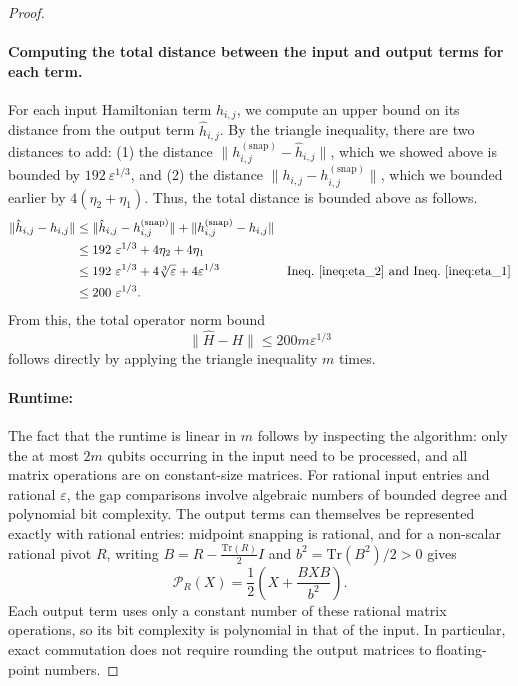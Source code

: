 \documentclass[a4paper,onecolumn,11pt]{quantumarticle}
\theoremstyle{plain}
\newcommand{\eps}{\varepsilon}
\newcommand{\snp}{{(\mathrm{snap})}}
\begin{document}
\begin{proof}
\paragraph{Computing the total distance between the input and output terms for each term.}
For each input Hamiltonian term $h_{i,j}$, we compute an upper bound on its distance from the output term $\hat{h}_{i,j}$. By the triangle inequality, there are two distances to add: (1) the distance $\|h^\snp_{i,j} - \hat{h}_{i,j}\|$, which we showed above is bounded by $192\ \eps^{1/3}$, and (2) the distance $\|h_{i,j} - h^\snp_{i,j} \|$, which we bounded earlier by $4 (\eta_2 + \eta_1)$. Thus, the total distance is bounded above as follows.
\begin{align*}
    \|\hat{h}_{i,j} - h_{i,j}\| &\leq \|\hat{h}_{i,j} - h^\snp_{i,j}\| + \|h^\snp_{i,j} - h_{i,j}\|\\
    & \leq 192\ \eps^{1/3} + 4 \eta_2 + 4 \eta_1\\
    & \leq 192\ \eps^{1/3} + 4 \sqrt[3]{\eps} + 4 \eps^{1/3} & \text{Ineq.~\ref{ineq:eta_2} and Ineq.~\ref{ineq:eta_1}}\\
    & \leq 200\ \eps^{1/3}.
\end{align*}
From this, the total operator norm bound
\[ \|\hat{H} - H \| \leq 200 m \eps^{1/3} \]
follows directly by applying the triangle inequality $m$ times.

\paragraph{Runtime:} The fact that the runtime is linear in $m$ follows by inspecting the algorithm: only the at most $2m$ qubits occurring in the input need to be processed, and all matrix operations are on constant-size matrices. For rational input entries and rational $\eps$, the gap comparisons involve algebraic numbers of bounded degree and polynomial bit complexity. The output terms can themselves be represented exactly with rational entries: midpoint snapping is rational, and for a non-scalar rational pivot $R$, writing $B=R-\frac{\mathrm{Tr}(R)}2I$ and $b^2=\mathrm{Tr}(B^2)/2>0$ gives
\[
\mathcal{P}_R(X)=\frac12\left(X+\frac{BXB}{b^2}\right).
\]
Each output term uses only a constant number of these rational matrix operations, so its bit complexity is polynomial in that of the input. In particular, exact commutation does not require rounding the output matrices to floating-point numbers.
\end{proof}
\end{document}
